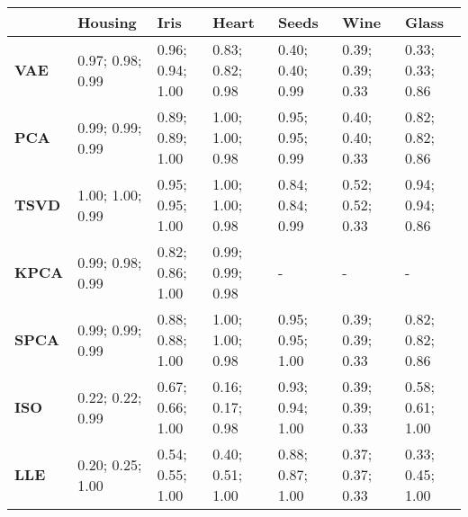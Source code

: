 \begin{tabular}{lllllll}
  \cline{2-7}
                                      & \textbf{Housing} & \textbf{Iris}    & \textbf{Heart}   & \textbf{Seeds}   & \textbf{Wine}    & \textbf{Glass}  \\ \hline
  \multicolumn{1}{l|}{\textbf{VAE}}  & 0.97; 0.98; 0.99 & 0.96; 0.94; 1.00 & 0.83; 0.82; 0.98 & 0.40; 0.40; 0.99 & 0.39; 0.39; 0.33 & 0.33; 0.33; 0.86 \\
  \multicolumn{1}{l|}{\textbf{PCA}}  & 0.99; 0.99; 0.99 & 0.89; 0.89; 1.00 & 1.00; 1.00; 0.98 & 0.95; 0.95; 0.99 & 0.40; 0.40; 0.33 & 0.82; 0.82; 0.86 \\
  \multicolumn{1}{l|}{\textbf{TSVD}} & 1.00; 1.00; 0.99 & 0.95; 0.95; 1.00 & 1.00; 1.00; 0.98 & 0.84; 0.84; 0.99 & 0.52; 0.52; 0.33 & 0.94; 0.94; 0.86 \\
  \multicolumn{1}{l|}{\textbf{KPCA}} & 0.99; 0.98; 0.99 & 0.82; 0.86; 1.00 & 0.99; 0.99; 0.98 & -                & -                & -                \\
  \multicolumn{1}{l|}{\textbf{SPCA}} & 0.99; 0.99; 0.99 & 0.88; 0.88; 1.00 & 1.00; 1.00; 0.98 & 0.95; 0.95; 1.00 & 0.39; 0.39; 0.33 & 0.82; 0.82; 0.86 \\
  \multicolumn{1}{l|}{\textbf{ISO}}  & 0.22; 0.22; 0.99 & 0.67; 0.66; 1.00 & 0.16; 0.17; 0.98 & 0.93; 0.94; 1.00 & 0.39; 0.39; 0.33 & 0.58; 0.61; 1.00 \\
  \multicolumn{1}{l|}{\textbf{LLE}}  & 0.20; 0.25; 1.00 & 0.54; 0.55; 1.00 & 0.40; 0.51; 1.00 & 0.88; 0.87; 1.00 & 0.37; 0.37; 0.33 & 0.33; 0.45; 1.00 \\ \hline
\end{tabular}